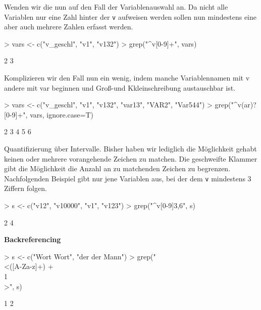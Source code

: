 \documentclass[a4paper]{report}
\begin{document}
Wenden wir die nun auf den Fall der Variablenauswahl an. Da nicht alle Variablen nur eine Zahl hinter der \texttt{v} aufweisen werden sollen nun mindestens eine aber auch mehrere Zahlen erfasst werden. 
 
\begin{Schunk}
\begin{Sinput}
> vars <- c("v_geschl", "v1", "v132")
> grep("^v[0-9]+", vars)
\end{Sinput}
\begin{Soutput}
[1] 2 3
\end{Soutput}
\end{Schunk}

Komplizieren wir den Fall nun ein wenig, indem manche Variablennamen mit v andere mit var beginnen und Groß-und Kkleinschreibung austauschbar ist.

\begin{Schunk}
\begin{Sinput}
> vars <- c("v_geschl", "v1", "v132", "var13", "VAR2", "Var544")
> grep("^v(ar)?[0-9]+", vars, ignore.case=T)
\end{Sinput}
\begin{Soutput}
[1] 2 3 4 5 6
\end{Soutput}
\end{Schunk}

Quantifizierung über Intervalle. Bisher haben wir lediglich die Möglichkeit gehabt keinen oder mehrere vorangehende Zeichen zu matchen. Die geschweifte Klammer gibt die Möglichkeit die Anzahl an zu matchenden Zeichen zu begrenzen.
Nachfolgenden Beispiel gibt nur jene Variablen aus, bei der dem \texttt{v} mindestens 3 Ziffern folgen.
\begin{Schunk}
\begin{Sinput}
> s <- c("v12", "v10000", "v1", "v123")
> grep("^v[0-9]{3,6}", s)
\end{Sinput}
\begin{Soutput}
[1] 2 4
\end{Soutput}
\end{Schunk}

\textbf{Backreferencing}

\begin{Schunk}
\begin{Sinput}
> s <- c("Wort Wort", "der der Mann")
> grep("\\<([A-Za-z]+) +\\1\\>", s)
\end{Sinput}
\begin{Soutput}
[1] 1 2
\end{Soutput}
\end{Schunk}
\end{document}
